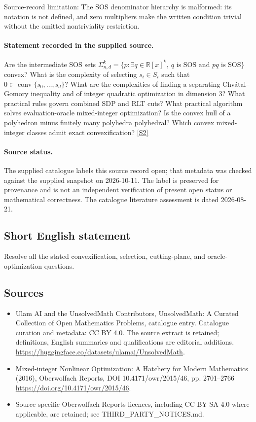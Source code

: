 \documentclass[11pt]{article}
\begin{document}
Source-record limitation: The SOS denominator hierarchy is malformed: its notation is not defined, and zero multipliers make the written condition trivial without the omitted nontriviality restriction.
\paragraph{Statement recorded in the supplied source.}
Are the intermediate SOS sets $\Sigma^k_{n,d}=\{p:\exists q\in\mathbb{R}[x]^k,\ q\text{ is SOS and }pq\text{ is SOS}\}$ convex? What is the complexity of selecting $s_i\in S_i$ such that $0\in\operatorname{conv}\{s_0,\ldots,s_d\}$? What are the complexities of finding a separating Chvátal–Gomory inequality and of integer quadratic optimization in dimension $3$? What practical rules govern combined SDP and RLT cuts? What practical algorithm solves evaluation-oracle mixed-integer optimization? Is the convex hull of a polyhedron minus finitely many polyhedra polyhedral? Which convex mixed-integer classes admit exact convexification? \href{https://doi.org/10.4171/owr/2015/46}{[S2]}
\paragraph{Source status.}
The supplied catalogue labels this source record open; that metadata was checked against the supplied snapshot on 2026-10-11. The label is preserved for provenance and is not an independent verification of present open status or mathematical correctness. The catalogue literature assessment is dated 2026-08-21.
\subsection{Short English statement}
Resolve all the stated convexification, selection, cutting-plane, and oracle-optimization questions.
\subsection{Sources}
\begin{itemize}
\item[S1] Ulam AI and the UnsolvedMath Contributors, UnsolvedMath: A Curated Collection of Open Mathematics Problems, catalogue entry. Catalogue curation and metadata: CC BY 4.0. The source extract is retained; definitions, English summaries and qualifications are editorial additions.
\url{https://huggingface.co/datasets/ulamai/UnsolvedMath}.
\item[S2] Mixed-integer Nonlinear Optimization: A Hatchery for Modern Mathematics (2016), Oberwolfach Reports, DOI 10.4171/owr/2015/46, pp. 2701--2766
\url{https://doi.org/10.4171/owr/2015/46}.
\item Source-specific Oberwolfach Reports licences, including CC BY-SA 4.0 where applicable, are retained; see THIRD\_PARTY\_NOTICES.md.
\end{itemize}
\end{document}
